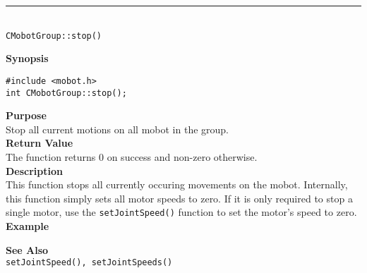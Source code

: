 \noindent
\vspace{5pt}
\rule{4.5in}{0.015in}\\
\noindent
{\LARGE \texttt{CMobotGroup::stop()}}\\
{}

\noindent
{\bf Synopsis}
\vspace{-8pt}
\begin{verbatim}
#include <mobot.h>
int CMobotGroup::stop();
\end{verbatim}

\noindent
{\bf Purpose}\\
Stop all current motions on all mobot in the group.\\

\noindent
{\bf Return Value}\\
The function returns 0 on success and non-zero otherwise.\\

\noindent
{\bf Description}\\
This function stops all currently occuring movements on the mobot. Internally, this function simply sets all motor speeds to zero. If it is only required to stop a single motor, use the 
\texttt{setJointSpeed()} function to set the motor's speed to zero. \\

\noindent
{\bf Example}\\
\noindent

\noindent
{\bf See Also}\\
\texttt{setJointSpeed(), setJointSpeeds()}

